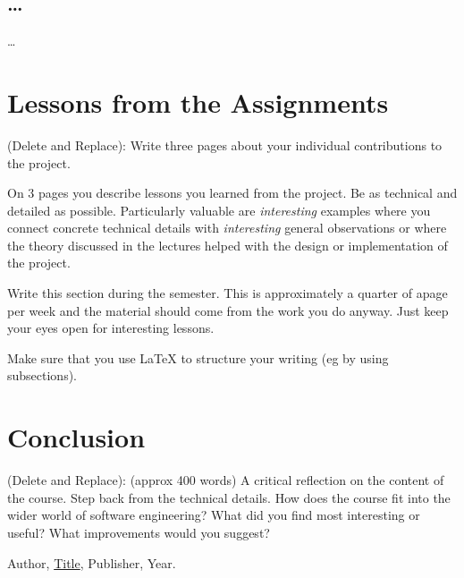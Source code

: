 \documentclass{article}
\theoremstyle{theorem}
\theoremstyle{definition}
\theoremstyle{remark}
\begin{document}
\subsection{\ldots}

\ldots

\section{Lessons from the Assignments}

(Delete and Replace): Write three pages about your individual contributions to the project.

On 3 pages you describe lessons you learned from the project. Be as technical and detailed as possible. Particularly valuable are \emph{interesting} examples where you connect concrete technical details with \emph{interesting} general observations or where the theory discussed in the lectures helped with the design or implementation of the project.

Write this section during the semester. This is approximately a quarter of apage per week and the material should come from the work you do anyway. Just keep your eyes open for interesting lessons.

Make sure that you use \LaTeX{} to structure your writing (eg by using subsections).

\section{Conclusion}\label{conclusion}

(Delete and Replace): (approx 400 words) A critical reflection on the content of the course. Step back from the technical details. How does the course fit into the wider world of software engineering? What did you find most interesting or useful? What improvements would you suggest?

\begin{thebibliography}{99}
 Author, \href{https://en.wikipedia.org/wiki/LaTeX}{Title}, Publisher, Year.
\end{thebibliography}
\end{document}
